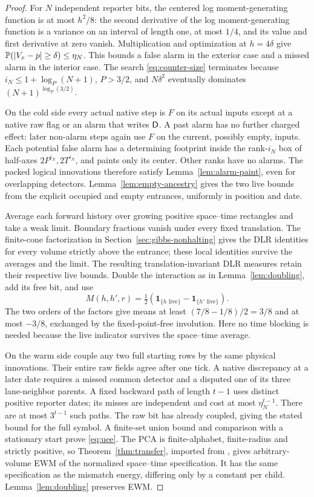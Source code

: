 \begin{proof}
For \(N\) independent reporter bits, the centered log moment-generating function is at most \(h^2/8\): the second derivative of the log moment-generating function is a variance on an interval of length one, at most \(1/4\), and its value and first derivative at zero vanish. Multiplication and optimization at \(h=4\delta\) give \(\mathbb P(|V_x-p|\ge\delta)\le\eta_N\). This bounds a false alarm in the exterior case and a missed alarm in the interior case. The search \eqref{eq:counter-size} terminates because \(i_N\le1+\log_P(N+1)\), \(P>3/2\), and \(N\delta^2\) eventually dominates \((N+1)^{\log_P(3/2)}\).

On the cold side every actual native step is \(F\) on its actual inputs except at a native raw flag or an alarm that writes \(\mathsf D\). A past alarm has no further charged effect: later non-alarm steps again use \(F\) on the current, possibly empty, inputs. Each potential false alarm has a determining footprint inside the rank-\(i_N\) box of half-axes \(2P^{i_N},2T^{i_N}\), and paints only its center. Other ranks have no alarms. The packed logical innovations therefore satisfy Lemma~\ref{lem:alarm-paint}, even for overlapping detectors. Lemma~\ref{lem:empty-ancestry} gives the two live bounds from the explicit occupied and empty entrances, uniformly in position and date.

Average each forward history over growing positive space--time rectangles and take a weak limit. Boundary fractions vanish under every fixed translation. The finite-cone factorization in Section~\ref{sec:gibbs-nonhalting} gives the DLR identities for every volume strictly above the entrance; these local identities survive the averages and the limit. The resulting translation-invariant DLR measures retain their respective live bounds. Double the interaction as in Lemma~\ref{lem:doubling}, add its free bit, and use
\[
M(h,h',r)=\tfrac12(\mathbf1_{\{h\text{ live}\}}-
                                \mathbf1_{\{h'\text{ live}\}}).
\]
The two orders of the factors give means at least \((7/8-1/8)/2=3/8\) and at most \(-3/8\), exchanged by the fixed-point-free involution. Here no time blocking is needed because the live indicator survives the space--time average.

On the warm side couple any two full starting rows by the same physical innovations. Their entire raw fields agree after one tick. A native discrepancy at a later date requires a missed common detector and a disputed one of its three lane-neighbor parents. A fixed backward path of length \(t-1\) uses distinct positive reporter dates; its misses are independent and cost at most \(\eta_N^{t-1}\). There are at most \(3^{t-1}\) such paths. The raw bit has already coupled, giving the stated bound for the full symbol. A finite-set union bound and comparison with a stationary start prove \eqref{eq:uee}. The PCA is finite-alphabet, finite-radius and strictly positive, so Theorem~\ref{thm:transfer}, imported from \cite[Theorem~3.1]{dmSpaceTime}, gives arbitrary-volume EWM of the normalized space--time specification. It has the same specification as the mismatch energy, differing only by a constant per child. Lemma~\ref{lem:doubling} preserves EWM.
\end{proof}

